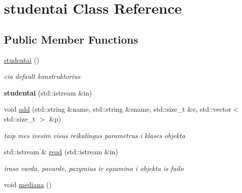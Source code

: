 \hypertarget{classstudentai}{}\section{studentai Class Reference}
\label{classstudentai}
\subsection*{Public Member Functions}
\begin{DoxyCompactItemize}
\item 
\mbox{\label{classstudentai_a60b1c161d9a3ba14298ecc0b126a4368}} 
\mbox{\hyperlink{classstudentai_a60b1c161d9a3ba14298ecc0b126a4368}{studentai}} ()
\begin{DoxyCompactList}\small\item\em cia default konstruktorius \end{DoxyCompactList}\item 
\mbox{\label{classstudentai_ae8d08abec1f93f85ba003e0d021328ca}} 
{\bfseries studentai} (std\+::istream \&in)
\item 
\mbox{\label{classstudentai_a0e57c802d8b37962f1ff8b67b504033d}} 
void \mbox{\hyperlink{classstudentai_a0e57c802d8b37962f1ff8b67b504033d}{add}} (std\+::string \&name, std\+::string \&sname, std\+::size\+\_\+t \&e, std\+::vector$<$ std\+::size\+\_\+t $>$ \&p)
\begin{DoxyCompactList}\small\item\em taip mes ivesim visus reikalingus parametrus i klases objekta \end{DoxyCompactList}\item 
\mbox{\label{classstudentai_ad9b22b6651e351b227a1df42d9507427}} 
std\+::istream \& \mbox{\hyperlink{classstudentai_ad9b22b6651e351b227a1df42d9507427}{read}} (std\+::istream \&in)
\begin{DoxyCompactList}\small\item\em iraso varda, pavarde, pazymius ir egzamina i objekta is failo \end{DoxyCompactList}\item 
\mbox{\label{classstudentai_ae04e30f512ead48e5994f93f28f8845a}} 
void \mbox{\hyperlink{classstudentai_ae04e30f512ead48e5994f93f28f8845a}{mediana}} ()

\end{DoxyCompactItemize}

